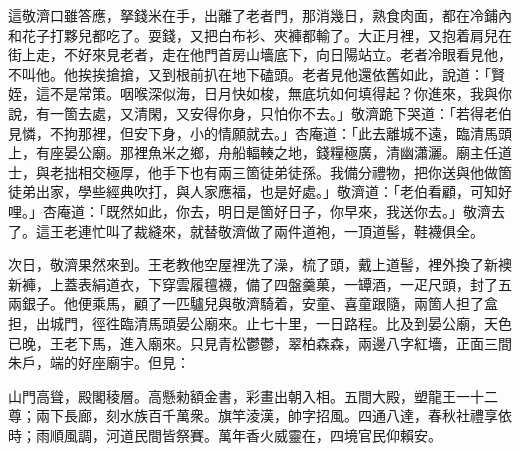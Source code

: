 這敬濟口雖答應，拏錢米在手，出離了老者門，那消幾日，熟食肉面，都在冷鋪內和花子打夥兒都吃了。耍錢，又把白布衫、夾褲都輸了。大正月裡，又抱着肩兒在街上走，不好來見老者，走在他門首房山墻底下，向日陽站立。老者冷眼看見他，不叫他。他挨挨搶搶，又到根前扒在地下磕頭。{}老者見他還依舊如此，說道：「賢姪，這不是常策。咽喉深似海，日月快如梭，無底坑如何填得起？你進來，我與你說，有一箇去處，又清閑，又安得你身，只怕你不去。」敬濟跪下哭道：「若得老伯見憐，不拘那裡，但安下身，小的情願就去。」杏庵道：「此去離城不遠，臨清馬頭上，有座晏公廟。那裡魚米之鄉，舟船輻輳之地，錢糧極廣，清幽瀟灑。廟主任道士，與老拙相交極厚，他手下也有兩三箇徒弟徒孫。我備分禮物，把你送與他做箇徒弟出家，學些經典吹打，與人家應福，也是好處。」敬濟道：「老伯看顧，可知好哩。」杏庵道：「既然如此，你去，明日是箇好日子，你早來，我送你去。」敬濟去了。這王老連忙叫了裁縫來，就替敬濟做了兩件道袍，一頂道髻，鞋襪俱全。

次日，敬濟果然來到。王老教他空屋裡洗了澡，梳了頭，戴上道髻，裡外換了新襖新褲，上蓋表絹道衣，下穿雲履氊襪，備了四盤羹菓，一罈酒，一疋尺頭，封了五兩銀子。他便乘馬，顧了一匹驢兒與敬濟騎着，安童、喜童跟隨，兩箇人担了盒担，出城門，徑徃臨清馬頭晏公廟來。止七十里，一日路程。比及到晏公廟，天色已晚，王老下馬，進入廟來。只見青松鬱鬱，翠柏森森，兩邊八字紅墻，正面三間朱戶，端的好座廟宇。但見：

\begin{myquote}
山門高聳，殿閣稜層。高懸勑額金書，彩畫出朝入相。{}五間大殿，塑龍王一十二尊；兩下長廊，刻水族百千萬衆。旗竿淩漢，帥字招風。四通八達，春秋社禮享依時；雨順風調，河道民間皆祭賽。萬年香火威靈在，四境官民仰賴安。
\end{myquote}

